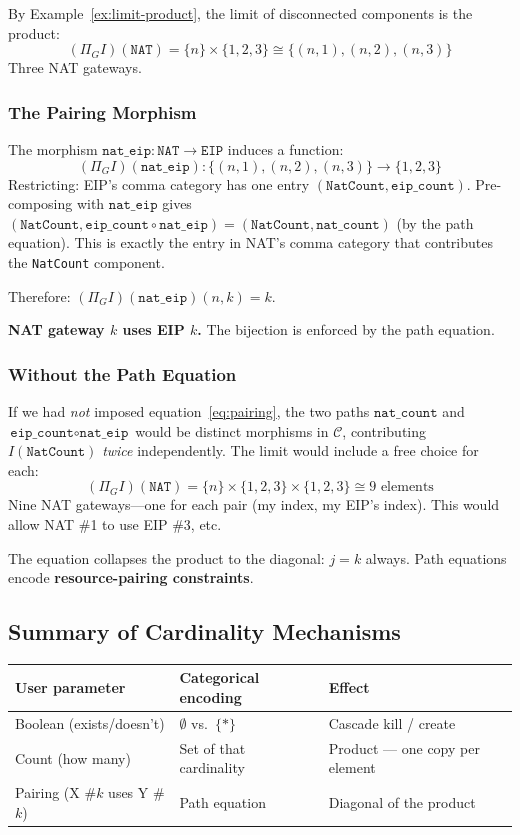 \documentclass[11pt,a4paper]{article}
\theoremstyle{definition}
\theoremstyle{plain}
\begin{document}
By Example~\ref{ex:limit-product}, the limit of disconnected components is the product:
\[
(\Pi_G I)(\texttt{NAT}) = \{n\} \times \{1,2,3\} \cong \{(n,1), (n,2), (n,3)\}
\]
Three NAT gateways.

\subsubsection{The Pairing Morphism}

The morphism $\texttt{nat\_eip} \colon \texttt{NAT} \to \texttt{EIP}$ induces a function:
\[
(\Pi_G I)(\texttt{nat\_eip}) \colon \{(n,1),(n,2),(n,3)\} \to \{1,2,3\}
\]
Restricting: EIP's comma category has one entry $(\texttt{NatCount}, \texttt{eip\_count})$. Pre-composing with $\texttt{nat\_eip}$ gives $(\texttt{NatCount}, \texttt{eip\_count} \circ \texttt{nat\_eip}) = (\texttt{NatCount}, \texttt{nat\_count})$ (by the path equation). This is exactly the entry in NAT's comma category that contributes the \texttt{NatCount} component.

Therefore: $(\Pi_G I)(\texttt{nat\_eip})(n, k) = k$.

\textbf{NAT gateway $k$ uses EIP $k$.} The bijection is enforced by the path equation.

\subsubsection{Without the Path Equation}

If we had \emph{not} imposed equation~\eqref{eq:pairing}, the two paths $\texttt{nat\_count}$ and $\texttt{eip\_count} \circ \texttt{nat\_eip}$ would be distinct morphisms in $\mathcal{C}$, contributing $I(\texttt{NatCount})$ \emph{twice} independently. The limit would include a free choice for each:
\[
(\Pi_G I)(\texttt{NAT}) = \{n\} \times \{1,2,3\} \times \{1,2,3\} \cong 9 \text{ elements}
\]
Nine NAT gateways---one for each pair (my index, my EIP's index). This would allow NAT \#1 to use EIP \#3, etc.

The equation collapses the product to the diagonal: $j = k$ always. Path equations encode \textbf{resource-pairing constraints}.

\subsection{Summary of Cardinality Mechanisms}

\begin{center}
\begin{tabular}{lll}
\toprule
\textbf{User parameter} & \textbf{Categorical encoding} & \textbf{Effect} \\
\midrule
Boolean (exists/doesn't) & $\emptyset$ vs.\ $\{*\}$ & Cascade kill / create \\
Count (how many) & Set of that cardinality & Product --- one copy per element \\
Pairing (X \#$k$ uses Y \#$k$) & Path equation & Diagonal of the product \\
\bottomrule
\end{tabular}
\end{center}
\end{document}
